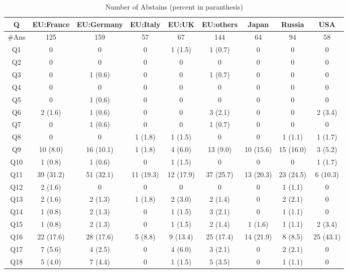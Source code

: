 \begin{table}[htb]%
\begin{center}\small%
\caption{Number of Abstains (percent in paranthesis)}\label{tab:abstain}%
\begin{tabular}{|c|c|c|c|c|c|c|c|c|}%
\hline%
Q & {\footnotesize EU:France} & {\footnotesize EU:Germany} & {\footnotesize EU:Italy} & {\footnotesize EU:UK} & {\footnotesize EU:others} & {\footnotesize Japan} & {\footnotesize Russia} & {\footnotesize USA}\\%
\hline%
\#Ans & 125 & 159 & 57 & 67 & 144 & 64 & 94 & 58 \\%
\hline%
\hline%
Q1 & 0 & 0 & 0 & 1 (1.5) & 1 (0.7) & 0 & 0 & 0 \\%
\hline%
Q2 & 0 & 0 & 0 & 0 & 0 & 0 & 0 & 0 \\%
\hline%
Q3 & 0 & 1 (0.6) & 0 & 0 & 1 (0.7) & 0 & 0 & 0 \\%
\hline%
Q4 & 0 & 0 & 0 & 0 & 0 & 0 & 0 & 0 \\%
\hline%
Q5 & 0 & 1 (0.6) & 0 & 0 & 0 & 0 & 0 & 0 \\%
\hline%
Q6 & 2 (1.6) & 1 (0.6) & 0 & 0 & 3 (2.1) & 0 & 0 & 2 (3.4) \\%
\hline%
Q7 & 0 & 1 (0.6) & 0 & 0 & 1 (0.7) & 0 & 0 & 0 \\%
\hline%
Q8 & 0 & 0 & 1 (1.8) & 1 (1.5) & 0 & 0 & 1 (1.1) & 1 (1.7) \\%
\hline%
Q9 & 10 (8.0) & 16 (10.1) & 1 (1.8) & 4 (6.0) & 13 (9.0) & 10 (15.6) & 15 (16.0) & 3 (5.2) \\%
\hline%
Q10 & 1 (0.8) & 1 (0.6) & 0 & 1 (1.5) & 0 & 0 & 0 & 1 (1.7) \\%
\hline%
Q11 & 39 (31.2) & 51 (32.1) & 11 (19.3) & 12 (17.9) & 37 (25.7) & 13 (20.3) & 23 (24.5) & 6 (10.3) \\%
\hline%
Q12 & 2 (1.6) & 0 & 0 & 0 & 0 & 0 & 1 (1.1) & 0 \\%
\hline%
Q13 & 2 (1.6) & 2 (1.3) & 1 (1.8) & 2 (3.0) & 2 (1.4) & 0 & 2 (2.1) & 0 \\%
\hline%
Q14 & 1 (0.8) & 2 (1.3) & 0 & 1 (1.5) & 3 (2.1) & 0 & 1 (1.1) & 0 \\%
\hline%
Q15 & 1 (0.8) & 2 (1.3) & 0 & 1 (1.5) & 2 (1.4) & 1 (1.6) & 1 (1.1) & 2 (3.4) \\%
\hline%
Q16 & 22 (17.6) & 28 (17.6) & 5 (8.8) & 9 (13.4) & 25 (17.4) & 14 (21.9) & 8 (8.5) & 25 (43.1) \\%
\hline%
Q17 & 7 (5.6) & 4 (2.5) & 0 & 4 (6.0) & 3 (2.1) & 0 & 2 (2.1) & 0 \\%
\hline%
Q18 & 5 (4.0) & 7 (4.4) & 0 & 1 (1.5) & 5 (3.5) & 0 & 1 (1.1) & 0 \\%

\end{tabular}
\end{center}
\end{table}

